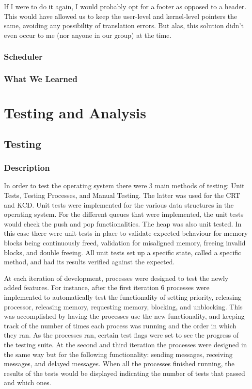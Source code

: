 \documentclass[12pt]{report}
\begin{document}
If I were to do it again, I would probably opt for a footer as opposed to a
header. This would have allowed us to keep the user-level and kernel-level
pointers the same, avoiding any possibility of translation errors. But alas,
this solution didn't even occur to me (nor anyone in our group) at the time.
\section{Scheduler}

\section{What We Learned}

\part{Testing and Analysis}

\chapter{Testing}

\section{Description}

In order to test the operating system there were 3 main methods of testing: Unit Tests, Testing Processes, and Manual Testing. The latter was used for the CRT and KCD. Unit tests were implemented for the various data structures in the operating system. For the different queues that were implemented, the unit tests would check the push and pop functionalities. The heap was also unit tested. In this case there were unit tests in place to validate expected behaviour for memory blocks being continuously freed, validation for misaligned memory, freeing invalid blocks, and double freeing. All unit tests set up a specific state, called a specific method, and had its results verified against the expected.

At each iteration of development, processes were designed to test the newly added features. For instance, after the first iteration 6 processes were implemented to automatically test the functionality of setting priority, releasing processor, releasing memory, requesting memory, blocking, and unblocking. This was accomplished by having the processes use the new functionality, and keeping track of the number of times each process was running and the order in which they ran. As the processes ran, certain test flags were set to see the progress of the testing suite. At the second and third iteration the processes were designed in the same way but for the following functionality: sending messages, receiving messages, and delayed messages.  When all the processes finished running, the results of the tests would be displayed indicating the number of tests that passed and which ones.
\end{document}
